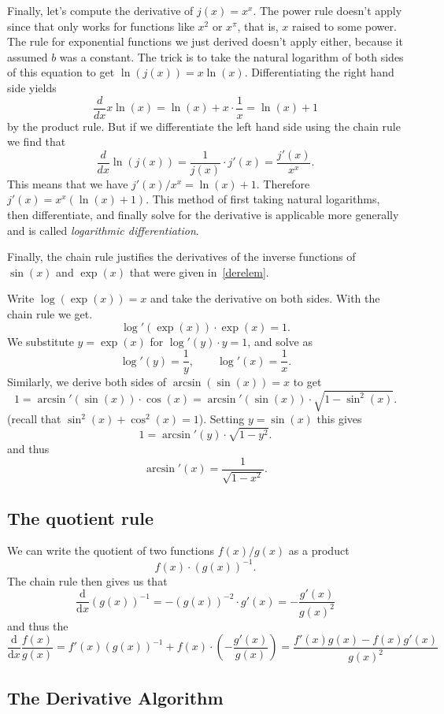 \begin{bsp}
Finally, let's compute the derivative of $j(x) = x^x$. The power rule doesn't
apply since that only works for functions like $x^2$ or $x^\pi$, that is, $x$
raised to some power. The rule for exponential functions we just derived
doesn't apply either, because it assumed $b$ was a constant. The trick is to
take the natural logarithm of both sides of this equation to get $\ln(j(x)) =
x\ln(x)$. Differentiating the right hand side yields
\[
\frac{d}{dx}x\ln(x) = \ln(x) + x\cdot\frac{1}{x} = \ln(x)+1
\]
by the product rule. But if we differentiate the left hand side using the
chain rule we find that
\[
\frac{d}{dx}\ln(j(x)) = \frac{1}{j(x)} \cdot j'(x) = \frac{j'(x)}{x^x}.
\]
This means that we have $j'(x)/x^x = \ln(x)+1$. Therefore $j'(x) =
x^x(\ln(x)+1)$. 
This method of first taking natural logarithms, then differentiate, and
finally solve for the derivative is applicable more generally and is called
\textit{logarithmic differentiation}.
\end{bsp}
\medskip

Finally, the chain rule justifies the derivatives of the inverse functions
of $\sin(x)$ and $\exp(x)$ that were given in~\ref{derelem}.

Write
$\log(\exp(x))=x$ and take the derivative on both sides. With the chain rule
we get.
\[
\log'(\exp(x))\cdot\exp(x)=1.
\]
We substitute $y=\exp(x)$ for $\log'(y)\cdot y=1$, and solve as
\[
\log'(y)=\frac{1}{y}, \qquad \log'(x)=\frac{1}{x}.
\]
Similarly, we derive both sides of $\arcsin(\sin(x))=x$ to get
\[
1=\arcsin'(\sin(x))\cdot\cos(x)=\arcsin'(\sin(x))\cdot\sqrt{1-\sin^2(x)}.
\]
(recall that $\sin^2(x)+\cos^2(x)=1$).
Setting $y=\sin(x)$ this gives
\[
1=\arcsin'(y)\cdot\sqrt{1-y^2}.
\]
and thus
\[
\arcsin'(x)=\frac{1}{\sqrt{1-x^2}}.
\]


\subsection{The quotient rule}

We can write the quotient of two functions $f(x)/g(x)$ as a product
\[
f(x)\cdot (g(x))^{-1}.
\]
The chain rule then gives us that
\[
\frac{\mbox{d}}{\mbox{d}x}\left(g(x)\right)^{-1}
=-\left(g(x)\right)^{-2}\cdot g'(x)=-\frac{g'(x)}{g(x)^2}
\]
and thus the 
\[
\frac{\mbox{d}}{\mbox{d}x}\frac{f(x)}{g(x)}=f'(x)(g(x))^{-1}+f(x)\cdot\left(-\frac{g'(x)}{g(x)}\right)
=\frac{f'(x)g(x)-f(x)g'(x)}{g(x)^2}
\]


\subsection{The Derivative Algorithm}

